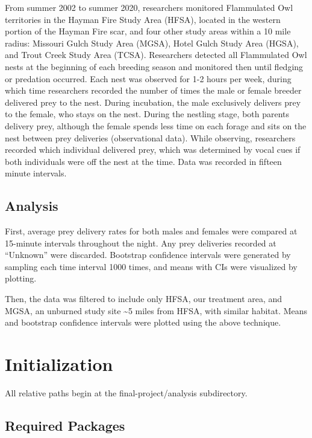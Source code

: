 \documentclass[]{article}
\begin{document}
From summer 2002 to summer 2020, researchers monitored Flammulated Owl
territories in the Hayman Fire Study Area (HFSA), located in the western
portion of the Hayman Fire scar, and four other study areas within a 10
mile radius: Missouri Gulch Study Area (MGSA), Hotel Gulch Study Area
(HGSA), and Trout Creek Study Area (TCSA). Researchers detected all
Flammulated Owl nests at the beginning of each breeding season and
monitored then until fledging or predation occurred. Each nest was
observed for 1-2 hours per week, during which time researchers recorded
the number of times the male or female breeder delivered prey to the
nest. During incubation, the male exclusively delivers prey to the
female, who stays on the nest. During the nestling stage, both parents
delivery prey, although the female spends less time on each forage and
sits on the nest between prey deliveries (observational data). While
observing, researchers recorded which individual delivered prey, which
was determined by vocal cues if both individuals were off the nest at
the time. Data was recorded in fifteen minute intervals.

\hypertarget{analysis}{%
\subsection{Analysis}\label{analysis}}

First, average prey delivery rates for both males and females were
compared at 15-minute intervals throughout the night. Any prey
deliveries recorded at ``Unknown'' were discarded. Bootstrap confidence
intervals were generated by sampling each time interval 1000 times, and
means with CIs were visualized by plotting.

Then, the data was filtered to include only HFSA, our treatment area,
and MGSA, an unburned study site \textasciitilde{}5 miles from HFSA,
with similar habitat. Means and bootstrap confidence intervals were
plotted using the above technique.

\hypertarget{initialization}{%
\section{Initialization}\label{initialization}}

All relative paths begin at the final-project/analysis subdirectory.

\hypertarget{required-packages}{%
\subsection{Required Packages}\label{required-packages}}
\end{document}
